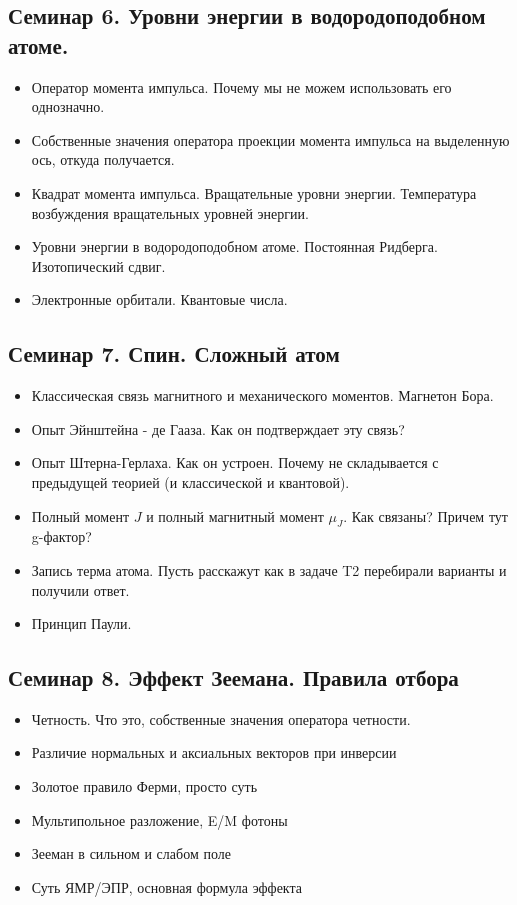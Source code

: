 \documentclass[12pt]{article}
\begin{document}
\subsection*{Семинар 6. Уровни энергии в водородоподобном атоме.}
\begin{itemize}
    \item Оператор момента импульса. Почему мы не можем использовать его однозначно.
    \item Собственные значения оператора проекции момента импульса на выделенную ось, откуда получается.
    \item Квадрат момента импульса. Вращательные уровни энергии. Температура возбуждения вращательных уровней энергии.
    \item Уровни энергии в водородоподобном атоме. Постоянная Ридберга. Изотопический сдвиг.
    \item Электронные орбитали. Квантовые числа.
\end{itemize}

\subsection*{Семинар 7. Спин. Сложный атом}
\begin{itemize}
    \item Классическая связь магнитного и механического моментов. Магнетон Бора.
    \item Опыт Эйнштейна - де Гааза. Как он подтверждает эту связь?
    \item Опыт Штерна-Герлаха. Как он устроен. Почему не складывается с предыдущей теорией (и классической и квантовой).
    \item Полный момент $J$ и полный магнитный момент $\mu_J$. Как связаны? Причем тут g-фактор?
    \item Запись терма атома. Пусть расскажут как в задаче T2 перебирали варианты и получили ответ.
    \item Принцип Паули.
\end{itemize}

\subsection*{Семинар 8. Эффект Зеемана. Правила отбора}
\begin{itemize}
    \item Четность. Что это, собственные значения оператора четности.
    \item Различие нормальных и аксиальных векторов при инверсии
    \item Золотое правило Ферми, просто суть
    \item Мультипольное разложение, E/M фотоны
    \item Зееман в сильном и слабом поле
    \item Суть ЯМР/ЭПР, основная формула эффекта
\end{itemize}

\end{document}
